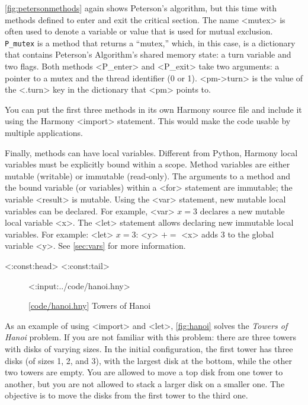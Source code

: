 \documentclass{report}
\newcommand{\harmonylink}[1]{%
[\href{https://harmony.cs.cornell.edu/#1}{\underline{#1}}]%
}
\newenvironment{code}{
\tcolorbox
}{
\endtcolorbox
}
\begin{document}
\autoref{fig:petersonmethods} again shows Peterson's algorithm,
but this time with methods defined to enter and exit the critical
section.
The name <{mutex}> is often used to denote a variable or value
that is used for mutual exclusion.
\texttt{P\_mutex} is a method that returns a ``mutex,'' which, in this
case, is a dictionary that contains Peterson's Algorithm's shared memory state:
a turn variable and two flags.
Both methods <{P_enter}> and <{P_exit}> take two arguments:
a pointer to a mutex and the thread identifier (0 or 1).
<{pm->turn}> is the value of the <{.turn}> key
in the dictionary that <{pm}> points to. 

You can put the first three methods in its own Harmony source file
and include it using the Harmony <{import}> statement.
%
%
This would make the code usable by multiple applications.

Finally, methods can have local variables.
Different from Python, Harmony local variables must be
explicitly bound within a scope.
Method variables are either mutable (writable) or immutable (read-only).
The arguments to a method and the bound variable (or
variables) within a <{for}> statement are immutable;
the variable <{result}> is mutable.
Using the <{var}> statement, new mutable local variables can be
declared.
For example, <{var}> $x = 3$ declares a new mutable local variable
<{x}>.
The <{let}> statement allows declaring new immutable local variables.
For example:
<{let}> $x = 3$: <{y}> $+$$=$ <{x}> adds 3 to the global variable
<{y}>.
See \autoref{sec:vars} for more information.

<{:const:head}>
<{:const:tail}>
\begin{figure}
\begin{code}
<{:input:../code/hanoi.hny}>
\end{code}
\caption{\harmonylink{code/hanoi.hny} Towers of Hanoi}
\label{fig:hanoi}
\end{figure}

As an example of using <{import}> and <{let}>,
\autoref{fig:hanoi} solves the \emph{Towers of Hanoi} problem.
If you are not familiar with this problem:
there are three towers with disks of varying sizes.
In the initial configuration, the first tower has three disks (of
sizes 1, 2, and 3), with the largest disk at the bottom, while the
other two towers are empty.  You are allowed to move a top disk
from one tower to another, but you are not allowed to stack a larger
disk on a smaller one.  The objective is to move the disks from the
first tower to the third one.
\end{document}
